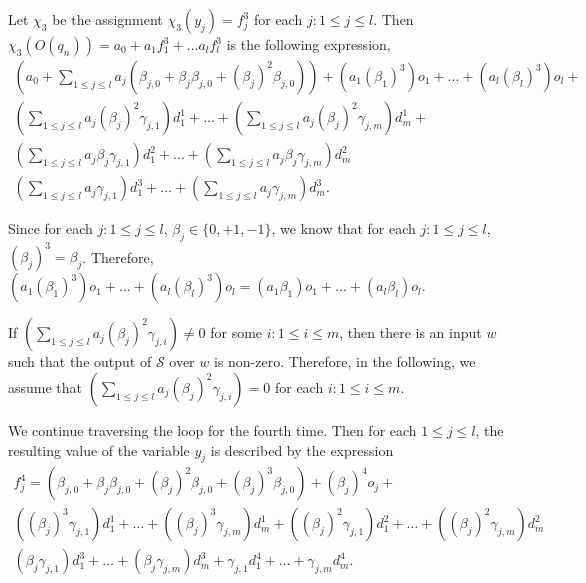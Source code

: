 \documentclass[runningheads,a4paper]{llncs}
\def\Ss{{\mathcal{S} }}
\begin{document}
Let $\chi_3$ be the assignment $\chi_3(y_j)=f^3_j$ for each $j: 1\le j \le l$.
Then $\chi_3(O(q_n)) = a_0+ a_1 f^3_1 + \dots a_l f^3_l$ is the following expression,
\[
\begin{array}{l}
(a_0 + \sum \limits_{1 \le j \le l} a_j (\beta_{j,0} + \beta_{j} \beta_{j,0} + (\beta_j)^2 \beta_{j,0})) +  (a_1 (\beta_1)^3) o_1 + \dots + (a_l (\beta_l)^3) o_l + \\
 (\sum \limits_{1 \le j \le l} a_j (\beta_{j})^2\gamma_{j,1}) d^1_1 + \dots + (\sum \limits_{1 \le j \le l} a_j (\beta_{j})^2\gamma_{j,m}) d^1_m + \\
(\sum \limits_{1 \le j \le l} a_j \beta_j \gamma_{j,1}) d^2_1 + \dots + (\sum \limits_{1 \le j \le l} a_j \beta_j \gamma_{j,m}) d^2_m \\
(\sum \limits_{1 \le j \le l} a_j \gamma_{j,1}) d^3_1 + \dots + (\sum \limits_{1 \le j \le l} a_j \gamma_{j,m}) d^3_m. 
\end{array}
\]

Since for each $j: 1 \le j \le l$, $\beta_j \in \{0,+1,-1\}$, we know that for each $j: 1 \le j \le l$, $(\beta_j)^3=\beta_j$. Therefore, $(a_1 (\beta_1)^3) o_1 + \dots + (a_l (\beta_l)^3) o_l = (a_1 \beta_1) o_1 + \dots + (a_l \beta_l) o_l$.

If $(\sum \limits_{1 \le j \le l} a_j (\beta_j)^2\gamma_{j,i}) \neq 0$ for some $i: 1 \le i \le m$, then there is an input $w$ such that the output of $\Ss$ over $w$ is non-zero. Therefore, in the following, we assume that $(\sum \limits_{1 \le j \le l} a_j (\beta_j)^2\gamma_{j,i}) = 0$ for each $i: 1 \le i \le m$.


We continue traversing the loop for the fourth time. Then for each $1 \le j \le l$, the resulting value of the variable $y_j$ is described by the expression 
\[
\begin{array}{l}
f^4_{j} = (\beta_{j,0} + \beta_{j} \beta_{j,0} + (\beta_j)^2 \beta_{j,0}+(\beta_j)^3 \beta_{j,0}) + (\beta_{j})^4 o_{j} +
\\
((\beta_{j})^3\gamma_{j,1}) d^1_1 +\dots + ((\beta_{j})^3 \gamma_{j,m}) d^1_m  + 
((\beta_{j})^2\gamma_{j,1}) d^2_1 +\dots + ((\beta_{j})^2 \gamma_{j,m}) d^2_m \\
(\beta_j \gamma_{j,1}) d^3_1 + \dots + (\beta_j \gamma_{j,m}) d^3_m + \gamma_{j,1} d^4_1 + \dots + \gamma_{j,m} d^4_m.
\end{array}
\]
\end{document}
